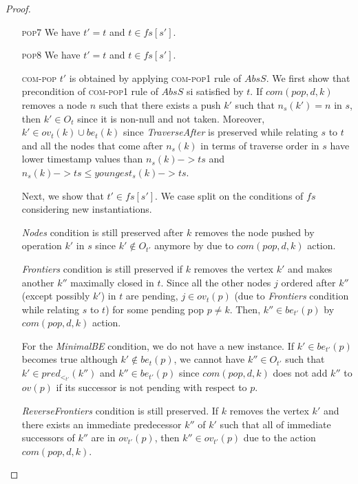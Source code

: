 \documentclass{article}
\begin{document}
\begin{proof}
\begin{itemize}
\item[\textsc{pop7}] We have $t' = t$ and $t \in fs[s']$.
\item[\textsc{pop8}] We have $t' = t$ and $t \in fs[s']$.
\item[\textsc{com-pop}] $t'$ is obtained by applying \textsc{com-pop1} rule of $AbsS$.
We first show that precondition of \textsc{com-pop1} rule of $AbsS$ si satisfied by $t$. If $com(pop,d,k)$ removes a  node $n$ such that there exists a push $k'$ such that $n_s(k') =n$ in $s$, then $k' \in O_t$ since it is non-null and not taken. Moreover, $k' \in ov_t(k) \cup be_t(k)$ since \emph{TraverseAfter} is preserved while relating $s$ to $t$ and all the nodes that come after $n_s(k)$ in terms of traverse order in $s$ have lower timestamp values than $n_s(k)->ts$ and $n_s(k)->ts \leq youngest_s(k)->ts$.

Next, we show that $t' \in fs[s']$. We case split on the conditions of $fs$ considering new instantiations.

\emph{Nodes} condition is still preserved after $k$ removes the node pushed by operation $k'$ in $s$ since $k' \notin O_{t'}$ anymore by due to $com(pop,d,k)$ action. 

\emph{Frontiers} condition is still preserved if $k$ removes the vertex $k'$ and makes another $k''$ maximally closed in $t$. Since all the other nodes $j$ ordered after $k''$ (except possibly $k'$) in $t$ are pending, $j \in ov_t(p)$ (due to \emph{Frontiers} condition while relating $s$ to $t$) for some pending pop $p \neq k$. Then, $k'' \in be_{t'}(p)$ by $com(pop,d,k)$ action. 

For the \emph{MinimalBE} condition, we do not have a new instance. If $k' \in be_{t'}(p)$ becomes true although $k' \notin be_t(p)$, we cannot have $k'' \in O_{t'}$ such that $k' \in pred_{<_{t'}}(k'')$ and $k'' \in be_{t'}(p)$ since $com(pop,d,k)$ does not add $k''$ to $ov(p)$ if its successor is not pending with respect to $p$.

\emph{ReverseFrontiers} condition is still preserved. If $k$ removes the vertex $k'$ and there exists an immediate predecessor $k''$ of $k'$ such that all of immediate successors of $k''$ are in $ov_{t'}(p)$, then $k'' \in ov_{t'}(p)$ due to the action $com(pop,d,k)$.


\end{itemize}
\end{proof}
\end{document}
